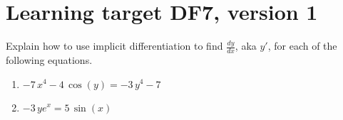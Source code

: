 \section{Learning target DF7, version 1}
\providecommand{\stxKnowl}{}\renewcommand{\stxKnowl}[1]{#1}
\providecommand{\stxOuttro}{}\renewcommand{\stxOuttro}[1]{#1}
\providecommand{\stxTitle}{}\renewcommand{\stxTitle}[1]{#1}
\renewcommand{\stxOuttro}[1]{}
\stxKnowl{
 Explain how to use implicit differentiation to find \(\frac{dy}{dx}\), aka \(y'\), for each of the following equations. 

\begin{enumerate}
\item
\stxKnowl{
\(-7 \, x^{4} - 4 \, \cos\left(y\right) = -3 \, y^{4} - 7\)

\stxOuttro{
\[\frac{dy}{dx}=\frac{7 \, x^{3}}{3 \, y^{3} + \sin\left(y\right)}\]

}
}
\vfill
\item
\stxKnowl{
\(-3 \, y e^{x} = 5 \, \sin\left(x\right)\)

\stxOuttro{
\[\frac{dy}{dx}=-\frac{1}{3} \, {\left(3 \, y e^{x} + 5 \, \cos\left(x\right)\right)} e^{\left(-x\right)}\]

}
}
\vfill
\end{enumerate}
}

\pagebreak

